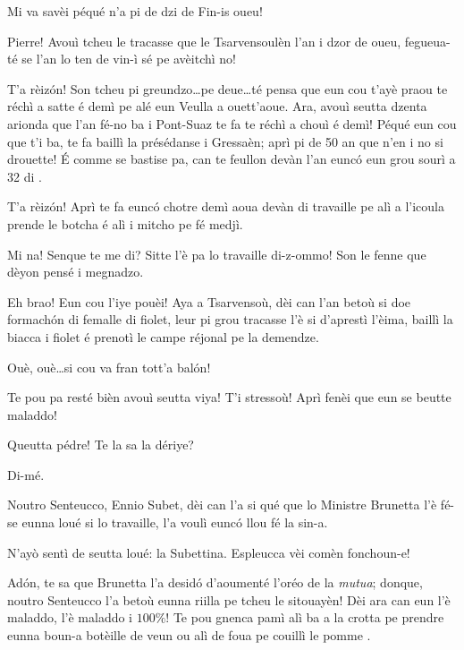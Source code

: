 \begin{drama}

\Pierrespeaks Mi va savèi péqué n'a pi de dzi de Fin-is oueu!

\Laurentspeaks Pierre! Avouì tcheu le tracasse que le Tsarvensoulèn l'an i dzor de oueu, fegueua-té se l'an lo ten de vin-ì sé pe avèitchì no!

\Pierrespeaks T'a rèiz\'on! Son tcheu pi greundzo\ldots pe deue\ldots té pensa que eun cou t'ayè praou te réchì a satte é demì pe alé eun Veulla a ouett'aoue. Ara, avouì seutta dzenta arionda que l'an fé-no ba i Pont-Suaz te fa te réchì a chouì é demì! Péqué eun cou que t'i  ba, te fa baillì la présédanse i Gressaèn; aprì pi de 50 an que n'en i no si drouette! \'E comme se bastise pa, can te feullon devàn l'an eunc\'o eun grou sourì a 32 di \sorrisone .

\Laurentspeaks T'a rèiz\'on! Aprì te fa eunc\'o chotre demì aoua devàn di travaille pe alì a l'icoula prende le botcha é alì i mitcho pe fé medjì.

\Pierrespeaks Mi na! Senque te me di? Sitte l'è pa lo travaille di-z-ommo! Son le fenne que dèyon pensé i megnadzo.

\Laurentspeaks {} Eh brao! Eun cou l'iye pouèi! Aya a Tsarvensoù, dèi can l'an betoù si doe formach\'on di femalle di fiolet, leur pi grou tracasse l'è si d'aprestì l'èima, baillì la biacca i fiolet é prenotì le campe réjonal pe la demendze.

\Pierrespeaks Ouè, ouè\ldots si cou va fran tott'a bal\'on!

\Laurentspeaks Te pou pa resté bièn avouì seutta viya! T'i stressoù! Aprì fenèi que eun se beutte maladdo!

\Pierrespeaks Queutta pédre! Te la sa la dériye?

\Laurentspeaks Di-mé.

\Pierrespeaks Noutro Senteucco, Ennio Subet, dèi can l'a si qué que lo Ministre Brunetta l'è fé-se eunna loué si lo travaille, l'a voulì eunc\'o llou fé la sin-a.

\Laurentspeaks N'ayò sentì de seutta loué: la Subettina. Espleucca vèi comèn fonchoun-e!

\Pierrespeaks Ad\'on, te sa que Brunetta l'a desid\'o d'aoumenté l'oréo de la \textit{mutua}; donque, noutro Senteucco l'a betoù eunna riilla pe tcheu le sitouayèn! Dèi ara can eun l'è maladdo, l'è maladdo i $100\%$! Te pou gnenca pamì alì ba a la crotta pe prendre eunna boun-a botèille de veun ou alì de foua pe couillì le pomme \mela .


\end{drama}
